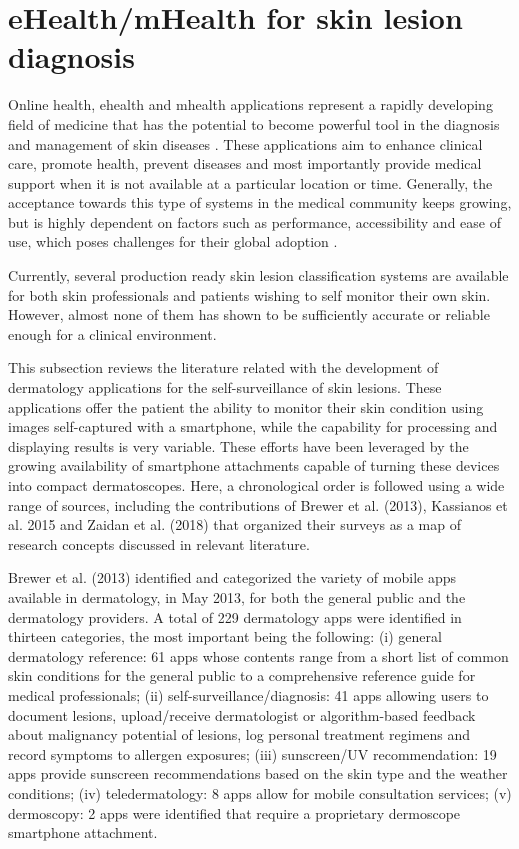 \section{eHealth/mHealth for skin lesion diagnosis}
Online health, ehealth and mhealth applications represent a rapidly developing field of medicine that has the potential to become powerful tool in the diagnosis and management of skin diseases \cite{Jaworek-Korjakowska2018}. These applications aim to enhance clinical care, promote health, prevent diseases and most importantly provide medical support when it is not available at a particular location or time. Generally, the acceptance towards this type of systems in the medical community keeps growing, but is highly dependent on factors such as performance, accessibility and ease of use, which poses challenges for their global adoption \cite{?}. \par
Currently, several production ready skin lesion classification systems are  available for both skin professionals and patients wishing to self monitor their own skin. However, almost none of them has shown to be sufficiently accurate or reliable enough for a clinical environment. \par 

This subsection reviews the literature related with the development of dermatology applications for the self-surveillance of skin lesions. These applications offer the patient the ability to monitor their skin condition using images self-captured with a smartphone, while the capability for processing and displaying results is very variable. These efforts have been leveraged by the growing availability of smartphone attachments capable of turning these devices into compact dermatoscopes. Here, a chronological order is followed using a wide range of sources, including the contributions of Brewer et al. (2013), Kassianos et al. 2015 and Zaidan et al. (2018) that organized their surveys as a map of research concepts discussed in relevant literature. \par

Brewer et al. (2013) identified and categorized the variety of mobile apps available in dermatology, in May 2013, for both the general public and the dermatology providers. A total of 229 dermatology apps were identified in thirteen categories, the most important being the following: (i) general dermatology reference: 61 apps whose contents range from a short list of common skin conditions for the general public to a comprehensive reference guide for medical professionals; (ii) self-surveillance/diagnosis: 41 apps allowing users to document lesions, upload/receive dermatologist or algorithm-based feedback about malignancy potential of lesions, log personal treatment regimens and record symptoms to allergen exposures; (iii) sunscreen/UV recommendation: 19 apps provide sunscreen recommendations based on the skin type and the weather conditions; (iv) teledermatology: 8 apps allow for mobile consultation services; (v) dermoscopy: 2 apps were identified that require a proprietary dermoscope smartphone attachment.

